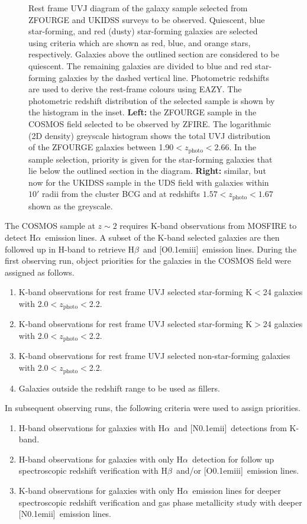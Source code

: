 \documentclass[iop]{emulateapj}
\newcommand{\Halpha}{H$\alpha$}
\newcommand{\Hbeta}{H$\beta$}
\newcommand{\NII}{[\hbox{{\rm N}\kern 0.1em{\sc ii}}]}
\newcommand{\OIII}{[\hbox{{\rm O}\kern 0.1em{\sc iii}}]}
\newcommand{\zphoto}{$z_{\mathrm{photo}}$}
\begin{document}
\begin{figure}
\caption{ Rest frame UVJ diagram of the galaxy sample selected from ZFOURGE and UKIDSS surveys to be observed.
Quiescent, blue star-forming, and red (dusty) star-forming galaxies are selected using \citet{Spitler2014} criteria which are shown as red, blue, and orange stars, respectively. 
Galaxies above the outlined section are considered to be quiescent. The remaining galaxies are divided to blue and red star-forming galaxies by the dashed vertical line. 
Photometric redshifts are used to derive the rest-frame colours using EAZY. The photometric redshift distribution of the selected sample is shown by the histogram in the inset.
{\bf Left:} the ZFOURGE sample in the COSMOS field selected to be observed by ZFIRE. 
The logarithmic (2D density) greyscale histogram shows the total UVJ distribution of the ZFOURGE galaxies between 1.90$<$\zphoto$<$2.66. 
In the sample selection, priority is given for the star-forming galaxies that lie below the outlined section in the diagram.
{\bf Right:} similar, but now for the UKIDSS sample in the UDS field with galaxies within $10'$ radii from the cluster BCG and at redshifts  $1.57<$\zphoto$<1.67$ shown as the greyscale. 
}
\label{fig:UVJ_selection}
\end{figure}



The COSMOS sample at $z\sim2$ requires K-band observations from MOSFIRE to detect \Halpha\ emission lines. 
A subset of the K-band selected galaxies are then followed up in H-band to retrieve \Hbeta\ and \OIII\ emission lines. 
During the first observing run, object priorities for the galaxies in the COSMOS field were assigned as follows. 
\begin{enumerate}
\item K-band observations for rest frame UVJ selected star-forming K$<$24 galaxies with 2.0$<$\zphoto$<$2.2. 
\item K-band observations for rest frame UVJ selected star-forming K$>$24 galaxies with 2.0$<$\zphoto$<$2.2. 
\item K-band observations for rest frame UVJ selected non-star-forming galaxies with 2.0$<$\zphoto$<$2.2.  
\item Galaxies outside the redshift range to be used as fillers. 
\end{enumerate}
In subsequent observing runs, the following criteria were used to assign priorities. 
\begin{enumerate}
\item H-band observations for galaxies with \Halpha\ and  \NII\ detections from K-band. 
\item H-band observations for galaxies with only \Halpha\ detection for follow up spectroscopic redshift verification with \Hbeta\ and/or  \OIII\ emission lines. 
\item K-band observations for galaxies with only \Halpha\ emission lines for deeper spectroscopic redshift verification and gas phase metallicity study with deeper \NII\ emission lines. 
\end{enumerate}
\end{document}
